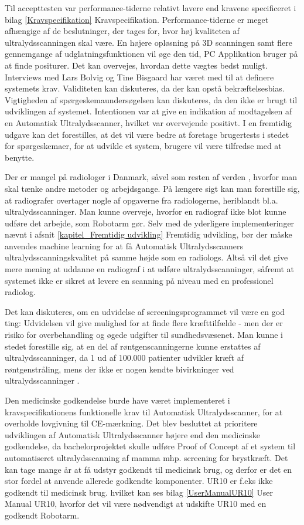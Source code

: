 Til accepttesten var performance-tiderne relativt lavere end kravene specificeret i bilag \ref{Kravspecifikation} Kravspecifikation. Performance-tiderne er meget afhængige af de beslutninger, der tages for, hvor høj kvaliteten af ultralydsscanningen skal være. En højere opløsning på 3D scanningen samt flere gennemgange af udglatningsfunktionen vil øge den tid, PC Applikation bruger på at finde positurer. Det kan overvejes, hvordan dette vægtes bedst muligt.   
\newpage
Interviews med Lars Bolvig og Tine Bisgaard har været med til at definere systemets krav. Validiteten kan diskuteres, da der kan opstå bekræftelsesbias. Vigtigheden af spørgeskemaundersøgelsen kan diskuteres, da den ikke er brugt til udviklingen af systemet. Intentionen var at give en indikation af modtagelsen af en Automatisk Ultralydsscanner, hvilket var overvejende positivt. I en fremtidig udgave kan det forestilles, at det vil være bedre at foretage brugertests i stedet for spørgeskemaer, for at udvikle et system, brugere vil være tilfredse med at benytte. 

Der er mangel på radiologer i Danmark, såvel som resten af verden \cite{Lagemangel}, hvorfor man skal tænke andre metoder og arbejdsgange. På længere sigt kan man forestille sig, at radiografer overtager nogle af opgaverne fra radiologerne, heriblandt bl.a. ultralydsscanninger. Man kunne overveje, hvorfor en radiograf ikke blot kunne udføre det arbejde, som Robotarm gør. Selv med de yderligere implementeringer nævnt i afsnit \ref{kapitel_Fremtidig udvikling} Fremtidig udvikling, bør der måske anvendes machine learning for at få Automatisk Ultralydsscanners ultralydsscanningskvalitet på samme højde som en radiologs. Altså vil det give mere mening at uddanne en radiograf i at udføre ultralydsscanninger, såfremt at systemet ikke er sikret at levere en scanning på niveau med en professionel radiolog.

Det kan diskuteres, om en udvidelse af screeningsprogrammet vil være en god ting: Udvidelsen vil give mulighed for at finde flere kræfttilfælde - men der er risiko for overbehandling og øgede udgifter til sundhedsvæsenet. Man kunne i stedet forestille sig, at en del af røntgenscanningerne kunne erstattes af ultralydsscanninger, da 1 ud af 100.000 \cite{Risk} patienter udvikler kræft af røntgenstråling, mens der ikke er nogen kendte bivirkninger ved ultralydsscanninger \cite{Ultralydsscanning}. 

Den medicinske godkendelse burde have været implementeret i kravspecifikationens funktionelle krav til Automatisk Ultralydsscanner, for at overholde lovgivning til CE-mærkning. Det blev besluttet at prioritere udviklingen af Automatisk Ultralydsscanner højere end den medicinske godkendelse, da bachelorprojektet skulle udføre Proof of Concept af et system til automatiseret ultralydsscanning af mamma mhp. screening for brystkræft. Det kan tage mange år at få udstyr godkendt til medicinsk brug, og derfor er det en stor fordel at anvende allerede godkendte komponenter. UR10 er f.eks ikke godkendt til medicinsk brug. hvilket kan ses bilag  \ref{UserManualUR10} User Manual UR10, hvorfor det vil være nødvendigt at udskifte UR10 med en godkendt Robotarm. 


 
